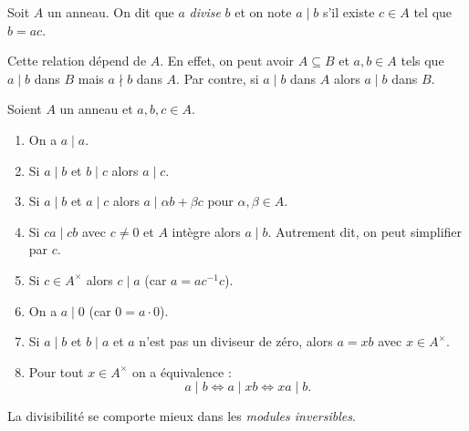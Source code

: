 \documentclass[./main]{subfiles}
\begin{document}
  \begin{defn}
    Soit $A$ un anneau. On dit que $a$ \textit{divise} $b$ et on note $a  \mid b$ s'il existe $c \in A$ tel que $b = a c$.
  \end{defn}

  \begin{rmk}
    Cette relation dépend de $A$. En effet, on peut avoir $A \subseteq B$ et $a,b \in A$ tels que $a  \mid b$ dans $B$ mais $a \nmid b$ dans $A$. Par contre, si $a  \mid b$ dans $A$ alors $a  \mid b$ dans $B$.
  \end{rmk}

  \begin{prop}
    Soient $A$ un anneau et $a, b, c \in A$.
    \begin{enumerate}
      \item On a $a  \mid a$.
      \item Si $a  \mid b$ et $b  \mid c$ alors $a  \mid c$.
      \item Si $a  \mid b$ et $a  \mid c$ alors $a  \mid \alpha b + \beta c$ pour $\alpha, \beta \in A$.
      \item Si $c a  \mid cb$ avec $c \neq 0$ et $A$ intègre alors $a  \mid b$. Autrement dit, on peut simplifier par $c$.
      \item Si $c \in A^\times$ alors $c  \mid a$ (car $a = a c^{-1} c$).
      \item On a $a  \mid 0$ (car $0 = a \cdot 0$).
      \item Si $a  \mid b$ et $b  \mid a$ et $a$ n'est pas un diviseur de zéro, alors $a = x b$ avec $x \in A^\times$.
      \item Pour tout $x \in A^\times$ on a équivalence :
        \[
        a  \mid b \iff a  \mid x b \iff x a  \mid b
        .\]
    \end{enumerate}
  \end{prop}

  \begin{rmk}
    La divisibilité se comporte mieux dans les \textit{modules inversibles}.
  \end{rmk}
\end{document}
